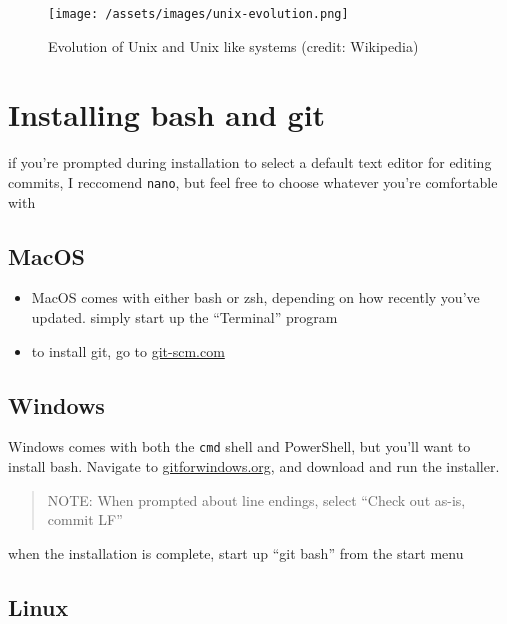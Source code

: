 \documentclass[
]{article}
\providecommand{\tightlist}{%
  \setlength{\itemsep}{0pt}\setlength{\parskip}{0pt}}
\begin{document}
\begin{figure}
\centering
\texttt{[image: /assets/images/unix-evolution.png]}
\caption{Evolution of Unix and Unix like systems (credit: Wikipedia)}
\end{figure}

\hypertarget{installing-bash-and-git}{%
\section{Installing bash and git}\label{installing-bash-and-git}}

if you're prompted during installation to select a default text editor
for editing commits, I reccomend \texttt{nano}, but feel free to choose
whatever you're comfortable with

\hypertarget{macos}{%
\subsection{MacOS}\label{macos}}

\begin{itemize}
\tightlist
\item
  MacOS comes with either bash or zsh, depending on how recently you've
  updated. simply start up the ``Terminal'' program
\item
  to install git, go to \href{https://git-scm.com}{git-scm.com}
\end{itemize}

\hypertarget{windows}{%
\subsection{Windows}\label{windows}}

Windows comes with both the \texttt{cmd} shell and PowerShell, but
you'll want to install bash. Navigate to
\href{https://gitforwindows.org}{gitforwindows.org}, and download and
run the installer.

\begin{quote}
NOTE: When prompted about line endings, select ``Check out as-is, commit
LF''
\end{quote}

when the installation is complete, start up ``git bash'' from the start
menu

\hypertarget{linux}{%
\subsection{Linux}\label{linux}}
\end{document}
